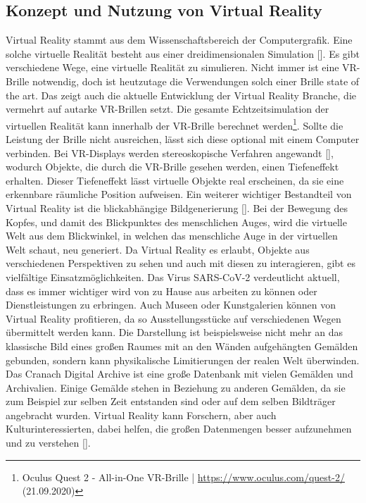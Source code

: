 \documentclass[a4paper,12pt,oneside]{article}
\begin{document}
    \subsection{Konzept und Nutzung von Virtual Reality} \label{Konzept und Nutzung von VR}
      Virtual Reality stammt aus dem Wissenschaftsbereich der Computergrafik. Eine solche
      virtuelle Realität besteht aus einer dreidimensionalen Simulation [\cite[13]{Dorner2013}].
      Es gibt verschiedene Wege, eine virtuelle Realität zu simulieren. Nicht immer ist eine 
      VR-Brille notwendig, doch ist heutzutage die Verwendungen solch einer Brille
      state of the art. Das zeigt auch die aktuelle 
      Entwicklung der Virtual Reality Branche, die vermehrt auf autarke VR-Brillen setzt.
      Die gesamte Echtzeitsimulation der virtuellen
      Realität kann innerhalb der VR-Brille berechnet werden\footnote{Oculus Quest 2 - All-in-One VR-Brille | \url{https://www.oculus.com/quest-2/} (21.09.2020)}.
      Sollte die Leistung der Brille nicht ausreichen, lässt sich diese optional mit einem
      Computer verbinden. Bei VR-Displays werden stereoskopische Verfahren angewandt [\cite[13]{Dorner2013}],
      wodurch Objekte, die durch die VR-Brille gesehen werden, einen Tiefeneffekt erhalten.
      Dieser Tiefeneffekt lässt virtuelle Objekte real erscheinen, da sie
      eine erkennbare räumliche Position aufweisen. Ein weiterer wichtiger
      Bestandteil von Virtual Reality ist die blickabhängige Bildgenerierung [\cite[13]{Dorner2013}].
      Bei der Bewegung des Kopfes, und damit des Blickpunktes des menschlichen Auges, wird
      die virtuelle Welt aus dem Blickwinkel, in welchen das
      menschliche Auge in der virtuellen Welt schaut, neu generiert. Da Virtual Reality 
      es erlaubt, Objekte
      aus verschiedenen Perspektiven zu sehen und auch mit diesen zu interagieren, gibt
      es vielfältige Einsatzmöglichkeiten. Das Virus SARS-CoV-2 verdeutlicht aktuell, dass es
      immer wichtiger wird von zu Hause aus arbeiten zu können oder Dienstleistungen zu
      erbringen. Auch Museen oder Kunstgalerien können von
      Virtual Reality profitieren, da so Ausstellungsstücke auf verschiedenen
      Wegen übermittelt werden kann. Die Darstellung ist beispielsweise nicht 
      mehr an das klassische Bild eines großen
      Raumes mit an den Wänden aufgehängten Gemälden gebunden, 
      sondern kann physikalische Limitierungen der
      realen Welt überwinden. \\
      Das Cranach Digital Archive ist eine große Datenbank mit
      vielen Gemälden und Archivalien. Einige Gemälde stehen in Beziehung zu anderen 
      Gemälden, da sie zum Beispiel zur selben Zeit entstanden sind oder auf dem selben
      Bildträger angebracht wurden. Virtual Reality kann Forschern, aber auch 
      Kulturinteressierten, dabei helfen, die großen Datenmengen besser aufzunehmen und
      zu verstehen [\cite[9]{Dorner2013}].
\end{document}
